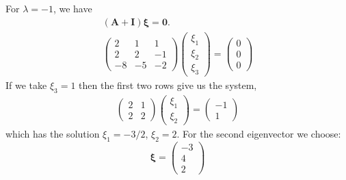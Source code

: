 {\begin{Solution}
\begin{enumerate}
    For $\lambda = -1$, we have
    \begin{gather*}
      ( \mathbf{A}  + \mathbf{I} ) \boldsymbol{\xi} = \mathbf{0}. \\
      \begin{pmatrix}
        2 & 1 & 1 \\
        2 & 2 & -1 \\
        -8 & -5 & -2 
      \end{pmatrix}
      \begin{pmatrix}
        \xi_1 \\
        \xi_2 \\
        \xi_3
      \end{pmatrix}
      =
      \begin{pmatrix}
        0 \\
        0 \\
        0
      \end{pmatrix}
    \end{gather*}
    If we take $\xi_3 = 1$ then the first two rows give us the system,
    \begin{gather*}
      \begin{pmatrix}
        2 & 1 \\
        2 & 2 
      \end{pmatrix}
      \begin{pmatrix}
        \xi_1 \\
        \xi_2 
      \end{pmatrix}
      =
      \begin{pmatrix}
        -1 \\
        1 
      \end{pmatrix}
    \end{gather*}
    which has the solution $\xi_1 = -3/2$, $\xi_2 = 2$.  For the second 
    eigenvector we choose:
    \[
    \boldsymbol{\xi} = 
    \begin{pmatrix}
      -3 \\
      4 \\
      2
    \end{pmatrix}
    \]



\end{enumerate}
\end{Solution}}
